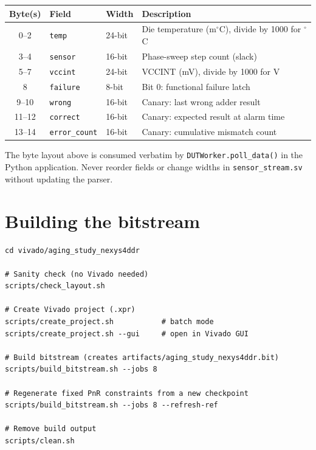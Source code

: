\documentclass[12pt, a4paper]{report}
\begin{document}
\begin{longtable}{@{}clll@{}}
  \toprule
  \textbf{Byte(s)} & \textbf{Field} & \textbf{Width} & \textbf{Description} \\
  \midrule
  \endhead
  0--2  & \texttt{temp}        & 24-bit & Die temperature (m$^\circ$C), divide by 1000 for $^\circ$C \\
  3--4  & \texttt{sensor}      & 16-bit & Phase-sweep step count (slack) \\
  5--7  & \texttt{vccint}      & 24-bit & VCCINT (mV), divide by 1000 for V \\
  8     & \texttt{failure}     &  8-bit & Bit 0: functional failure latch \\
  9--10 & \texttt{wrong}       & 16-bit & Canary: last wrong adder result \\
  11--12 & \texttt{correct}    & 16-bit & Canary: expected result at alarm time \\
  13--14 & \texttt{error\_count} & 16-bit & Canary: cumulative mismatch count \\
  \bottomrule
\end{longtable}

\begin{warningbox}
The byte layout above is consumed verbatim by \texttt{DUTWorker.poll\_data()} in the
Python application. Never reorder fields or change widths in \texttt{sensor\_stream.sv}
without updating the parser.
\end{warningbox}

\section{Building the bitstream}
\label{sec:build}

\begin{lstlisting}[style=shell, caption={Build commands (from repo root)}]
cd vivado/aging_study_nexys4ddr

# Sanity check (no Vivado needed)
scripts/check_layout.sh

# Create Vivado project (.xpr)
scripts/create_project.sh           # batch mode
scripts/create_project.sh --gui     # open in Vivado GUI

# Build bitstream (creates artifacts/aging_study_nexys4ddr.bit)
scripts/build_bitstream.sh --jobs 8

# Regenerate fixed PnR constraints from a new checkpoint
scripts/build_bitstream.sh --jobs 8 --refresh-ref

# Remove build output
scripts/clean.sh
\end{lstlisting}
\end{document}
